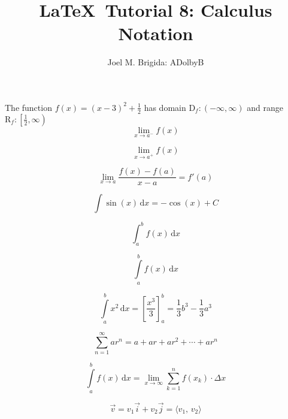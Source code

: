 \documentclass[11pt, letterpaper]{article}
\title{\LaTeX\ Tutorial 8: Calculus Notation}
\author{Joel M. Brigida: ADolbyB}
\date{} %
\begin{document}
\maketitle
\thispagestyle{empty} %

\pagebreak
\setcounter{page}{1} %

The function $f(x) = (x-3)^2 + \frac{1}{2}$ has domain $\mathrm{D}_f:(-\infty, \infty)$ and range $\mathrm{R}_f:\left[\frac{1}{2}, \infty\right)$
\begin{equation}
    \lim \limits_{x \to a^-} f(x)
\end{equation}

\begin{equation}
    \lim \limits_{x \to a^+} f(x)
\end{equation}

\begin{equation}
    \lim \limits_{x \to a} \frac{f(x) - f(a)}{x-a} = f'(a)
\end{equation}

\begin{equation}
    \int \sin(x) \, \mathrm{d}x = -\cos(x) + C
\end{equation}

\begin{equation}
    \int_{a}^{b} f(x) \, \mathrm{d}x %
\end{equation}

\begin{equation}
    \int \limits_a^b f(x) \, \mathrm{d}x
\end{equation}

\begin{equation}
    \int \limits_{a}^{b} x^2 \, \mathrm{d}x = \left[\frac{x^3}{3}\right]_{a}^{b} = \frac{1}{3}b^3 - \frac{1}{3}a^3
\end{equation}

\begin{equation}
    \sum \limits_{n=1}^{\infty}ar^n = a + ar + ar^2 + \cdots + ar^n
\end{equation}

\begin{equation}
    \int \limits_a^b f(x) \, \mathrm{d}x = \lim \limits_{x \to \infty} \sum \limits_{k=1}^{n} f(x_k) \cdot \Delta x
\end{equation}

\begin{equation}
    \vec{v} = v_1 \vec{i} + v_2 \vec{j} = \langle v_1, \, v_2 \rangle
\end{equation}
\end{document}
